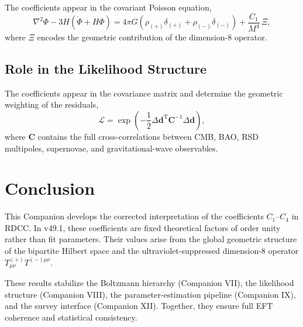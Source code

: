 \documentclass[11pt,a4paper]{article}
\begin{document}
The coefficients appear in the covariant Poisson equation,
\begin{equation}
\nabla^2 \Phi - 3H(\dot{\Phi} + H\Phi)
=
4\pi G \left( \rho_{(+)} \delta_{(+)} + \rho_{(-)} \delta_{(-)} \right)
+
\frac{C_1}{M^4} \, \Xi,
\end{equation}
where $\Xi$ encodes the geometric contribution of the dimension-8 operator.
\subsection[Role in the Likelihood Structure]{Role in the Likelihood Structure}

The coefficients appear in the covariance matrix and determine the geometric
weighting of the residuals,
\begin{equation}
\mathcal{L}
=
\exp\left(
-\frac{1}{2}
\Delta\mathbf{d}^{\mathrm{T}}
\mathbf{C}^{-1}
\Delta\mathbf{d}
\right),
\end{equation}
where $\mathbf{C}$ contains the full cross-correlations between CMB, BAO, RSD
multipoles, supernovae, and gravitational-wave observables.

\section{Conclusion}

This Companion develops the corrected interpretation of the coefficients
$C_1$–$C_4$ in RDCC. In v49.1, these coefficients are fixed theoretical factors
of order unity rather than fit parameters. Their values arise from the global
geometric structure of the bipartite Hilbert space and the ultraviolet-suppressed
dimension-8 operator $T^{(+)}_{\mu\nu}T^{(-)\mu\nu}$.

These results stabilize the Boltzmann hierarchy (Companion VII), the likelihood
structure (Companion VIII), the parameter-estimation pipeline (Companion IX),
and the survey interface (Companion XII). Together, they ensure full EFT
coherence and statistical consistency.
\end{document}
